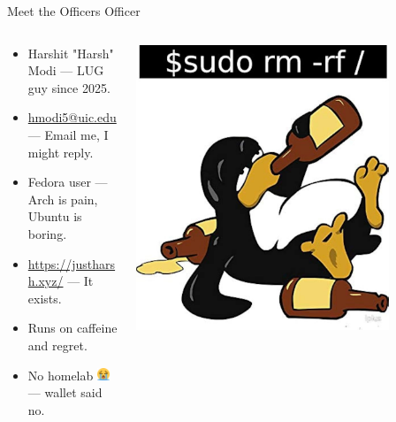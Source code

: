 \documentclass{beamer}
\begin{document}
\begin{frame}{Meet the Officers}
    {\Huge Officer}
    \begin{columns}
        \begin{column}{0.5\textwidth}
            \begin{itemize}
                \item {\Large Harshit "Harsh" Modi} — LUG guy since 2025.
                \item {\scriptsize \href{mailto:hmodi5@uic.edu}{hmodi5@uic.edu}} — Email me, I might reply.
                \item {\small Fedora user} — Arch is pain, Ubuntu is boring.
                \item {\small \url{https://justharsh.xyz/}} — It exists.
                \item Runs on caffeine and regret.
                \item No homelab \includegraphics[width=1em]{cry_emoji.png} — wallet said no.
            \end{itemize}
        \end{column}
        \begin{column}{0.5\textwidth}
            \centering
            \includegraphics[width=0.8\textwidth]{drunk_tux.jpg}
        \end{column}
    \end{columns}
\end{frame}
\end{document}
